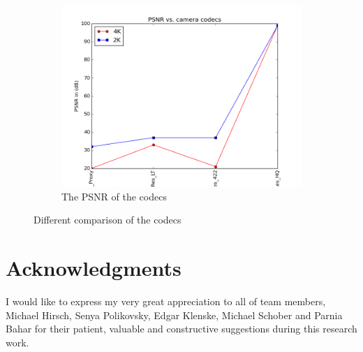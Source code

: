 \documentclass[[12pt,DIV14,BCOR12mm,a4paper,footexclude,headinclude,halfparskip-,twoside,openright,cleardoubleempty,idxtotoc,bibtotoc]{article}
\begin{document}
\begin{figure}[ht]
	\begin{subfigure}[b]{0.45\textwidth}
	      \includegraphics[width=\textwidth]{figures/psnr.png}
	      \caption{The PSNR of the codecs}
		\label{fig_bit_c}
	\end{subfigure}
	\caption{Different comparison of the codecs}
	\label{fig_cam}
\end{figure}





\section{Acknowledgments}

I would like to express my very great appreciation to all of team members, Michael Hirsch, Senya Polikovsky, Edgar Klenske, Michael Schober and Parnia Bahar for their patient, valuable and constructive suggestions during this research work.
\end{document}
